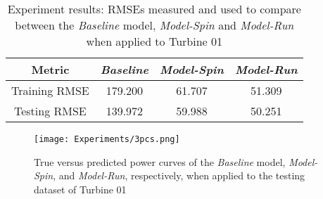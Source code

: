       \begin{table}[h]
        \centering
    \begin{tabular}{|c|c|c|c|}
    \hline
         \textbf{Metric} & \textbf{\emph{Baseline}} & \textbf{\emph{Model-Spin}} & \textbf{\emph{Model-Run}}\\
         \hline
         Training RMSE & 179.200 & 61.707 & 51.309\\
         \hline
         Testing RMSE & 139.972 & 59.988 & 50.251\\
    \hline
    \end{tabular}
    \caption{Experiment results: RMSEs measured and used to compare between the \emph{Baseline} model, \emph{Model-Spin} and \emph{Model-Run} when applied to Turbine 01}
        \label{tab:Experiment IV results}
    \end{table}

    \begin{figure}[h]
        \begin{center}
          \texttt{[image: Experiments/3pcs.png]}
        \end{center}
        \caption{True versus predicted power curves of the \emph{Baseline} model, \emph{Model-Spin}, and \emph{Model-Run}, respectively, 
        when applied to the testing dataset of Turbine 01}
        \label{fig:3pcs}
      \end{figure}
    

